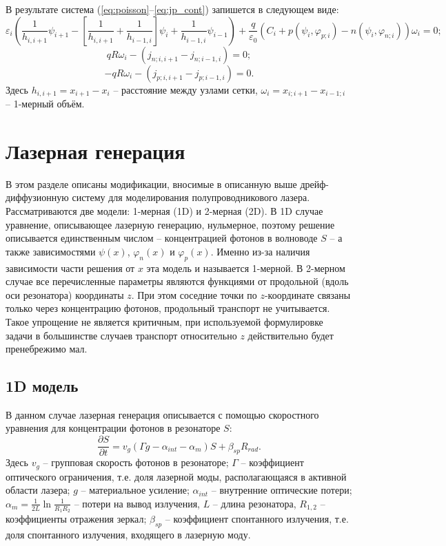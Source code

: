 \documentclass{article}
\begin{document}
В результате система (\ref{eq:poisson}--\ref{eq:jp_cont}) запишется в следующем виде:
\begin{equation}
\varepsilon_i \left( \frac{1}{h_{i,i+1}} \psi_{i+1} -
                   \left[\frac{1}{h_{i,i+1}}+\frac{1}{h_{i-1,i}}\right] \psi_{i} +
                   \frac{1}{h_{i-1,i}} \psi_{i-1} \right)
+\frac{q}{\varepsilon_0} \left( C_i + p(\psi_i, \varphi_{p;i})
                                - n(\psi_i, \varphi_{n;i})
                         \right) \omega_i
= 0;
\end{equation}
\begin{equation}
qR \omega_i - (j_{n;i,i+1} - j_{n;i-1,i}) = 0;
\end{equation}
\begin{equation}
-qR \omega_i - (j_{p;i,i+1} - j_{p;i-1,i}) = 0.
\end{equation}
Здесь $h_{i,i+1} = x_{i+1} - x_i$ -- расстояние между узлами сетки,
$\omega_i = x_{i;i+1} - x_{i-1;i}$ -- 1-мерный объём.

\section{Лазерная генерация}

В этом разделе описаны модификации, вносимые в описанную выше дрейф-диффузионную
систему для моделирования полупроводникового лазера. Рассматриваются
две модели: 1-мерная (1D) и 2-мерная (2D). В 1D случае уравнение, описывающее
лазерную генерацию, нульмерное, поэтому решение описывается единственным
числом -- концентрацией фотонов в волноводе $S$ -- а также зависимостями
$\psi(x)$, $\varphi_n(x)$ и $\varphi_p(x)$. Именно из-за наличия зависимости
части решения от $x$ эта модель и называется 1-мерной. В 2-мерном случае
все перечисленные параметры являются функциями от продольной (вдоль оси
резонатора) координаты $z$. При этом соседние точки по $z$-координате
связаны только через концентрацию фотонов, продольный транспорт не учитывается.
Такое упрощение не является критичным, при используемой формулировке задачи
в большинстве случаев транспорт относительно $z$ действительно будет
пренебрежимо мал.

\subsection{1D модель}
В данном случае лазерная генерация описывается с помощью скоростного уравнения
для концентрации фотонов в резонаторе $S$:
\begin{equation}
    \frac{\partial{S}}{\partial{t}} =
    v_g (\Gamma g - \alpha_{int} - \alpha_m) S + \beta_{sp} R_{rad}.
    \label{eq:photons_0D}
\end{equation}
Здесь $v_g$ -- групповая скорость фотонов в резонаторе;
$\Gamma$ -- коэффициент оптического ограничения, т.е. доля лазерной моды,
располагающаяся в активной области лазера;
$g$ -- материальное усиление;
$\alpha_{int}$ -- внутренние оптические потери;
$\alpha_m = \frac{1}{2L} \ln{\frac{1}{R_1R_2}}$ -- потери на вывод излучения,
$L$ -- длина резонатора, $R_{1,2}$ -- коэффициенты отражения зеркал;
$\beta_{sp}$ -- коэффициент спонтанного излучения, т.е. доля спонтанного
излучения, входящего в лазерную моду.
\end{document}
